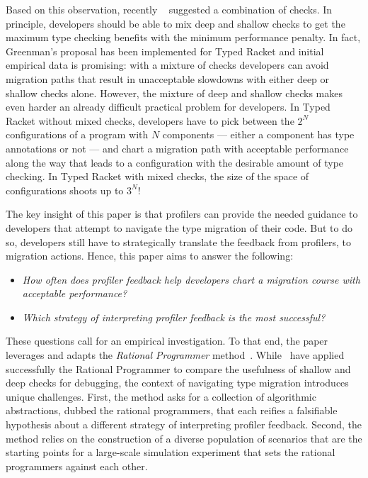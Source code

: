  Based on this observation, recently
 ~\citet{g-thesis-2020,g-deep-shallow} suggested a combination of checks.
 In principle, developers should be able to mix deep and shallow checks
 to get the maximum type checking benefits with the minimum performance
 penalty.  In fact, Greenman's proposal has been implemented for Typed
 Racket and initial empirical data is promising: with a mixture of checks
 developers can avoid migration paths that result in unacceptable
 slowdowns with either deep or shallow checks alone.  However, the mixture
 of deep and shallow checks makes even harder an already difficult
 practical problem for developers.  In Typed Racket without mixed checks,
 developers have to pick  between the $2^N$ configurations of a program
 with $N$ components --- either a component has type annotations or not
 --- and chart a migration path with acceptable performance along the way
 that leads to a configuration with the desirable amount of type checking.
 In Typed Racket with mixed checks, the size of the space of
 configurations shoots up to $3^N$! 

The key insight of this paper is that profilers can provide the needed guidance to
developers that attempt to navigate the type migration of their code.
But to do so, developers still have to strategically 
translate the feedback from profilers, to migration actions. 
Hence, this paper aims to answer the following: 
\begin{itemize}
  \item    
    {\em How often does profiler feedback help developers
    chart a migration course with acceptable performance?} 
  \item
   {\em Which strategy of interpreting profiler feedback is the most
    successful?}
\end{itemize}   

These questions call for an empirical investigation. To that end, the paper
leverages and adapts the \emph{Rational Programmer}
method~\cite{lksfd-popl-2020,lgfd-icfp-2021}.
While~\citet{lgfd-icfp-2021} have applied successfully the Rational
Programmer to compare the usefulness of shallow and deep checks for
debugging, the context of navigating type migration introduces unique
challenges. First, the method asks for a collection of algorithmic
abstractions, dubbed the rational programmers, that each reifies a
falsifiable hypothesis about a different strategy of interpreting profiler
feedback.  Second, the method relies on the construction of a diverse
population of scenarios that are the starting points for a large-scale
simulation experiment that sets the rational programmers against each
other.    


